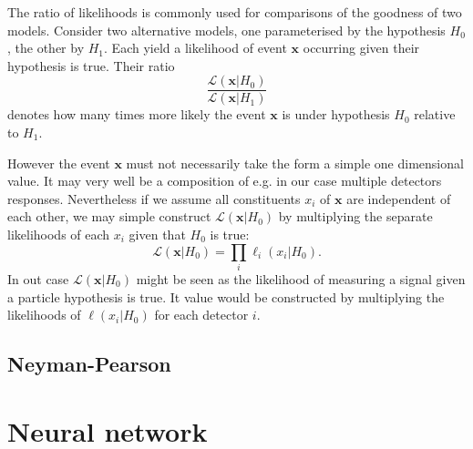 The ratio of likelihoods is commonly used for comparisons of the goodness of two models. Consider two alternative models, one parameterised by the hypothesis $H_0$, the other by $H_1$. Each yield a likelihood of event $\pmb{x}$ occurring given their hypothesis is true. Their ratio
\begin{equation*}
	\frac{\mathcal{L}(\pmb{x}|H_0)}{\mathcal{L}(\pmb{x}|H_1)}
\end{equation*} denotes how many times more likely the event $\pmb{x}$ is under hypothesis $H_0$ relative to $H_1$.

However the event $\pmb{x}$ must not necessarily take the form a simple one dimensional value. It may very well be a composition of e.g. in our case multiple detectors responses. Nevertheless if we assume all constituents $x_i$ of $\pmb{x}$ are independent of each other, we may simple construct $\mathcal{L}(\pmb{x}|H_0)$ by multiplying the separate likelihoods of each $x_i$ given that $H_0$ is true:
\begin{equation*}
	\mathcal{L}(\pmb{x}|H_0) = \prod \limits_{i} \ell_i(x_i|H_0).
\end{equation*}
In out case $\mathcal{L}(\pmb{x}|H_0)$ might be seen as the likelihood of measuring a signal given a particle hypothesis is true. It value would be constructed by multiplying the likelihoods of $\ell(x_i|H_0)$ for each detector $i$.

\subsection{Neyman-Pearson}
\label{subsec:likelihood_ratios_neyman_pearson}

\section{Neural network}
\label{sec:neural_network}
